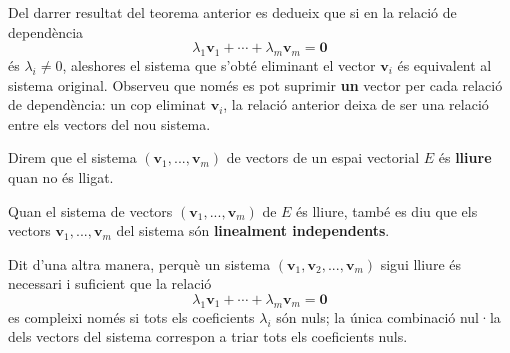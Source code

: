 \begin{observacio}
Del darrer resultat del teorema anterior es dedueix que si en la relació de
dependència%
\begin{equation*}
\lambda _{1}\mathbf{v}_{1}+\cdots +\lambda _{m}\mathbf{v}_{m}=\mathbf{0}
\end{equation*}%
és $\lambda _{i}\neq 0$, aleshores el sistema que s'obté eliminant el vector $%
\mathbf{v}_{i}$ és equivalent al sistema original. Observeu que només es pot
suprimir \textbf{un} vector per cada relació de dependència: un cop eliminat $%
\mathbf{v}_{i}$, la relació anterior deixa de ser una relació entre els
vectors del nou sistema.
\end{observacio}

\begin{definicio}
Direm que el sistema $(\mathbf{v}_{1},...,\mathbf{v}_{m})$ de vectors de
un espai vectorial $E$ és \textbf{lliure} quan no és lligat.

Quan el sistema de vectors $(\mathbf{v}_{1},...,\mathbf{v}_{m})$ de $%
E$ és lliure, també es diu que els vectors $\mathbf{v}%
_{1},...,\mathbf{v}_{m}$ del sistema són \textbf{linealment independents}.
\end{definicio}

\begin{observacio}
Dit d'una altra manera, perquè un sistema $(\mathbf{v}_{1},\mathbf{v}_{2},...,%
\mathbf{v}_{m})$ sigui lliure és necessari i suficient que la relació%
\begin{equation*}
\lambda _{1}\mathbf{v}_{1}+\cdots +\lambda _{m}\mathbf{v}_{m}=\mathbf{0}
\end{equation*}%
es compleixi només si tots els coeficients $\lambda _{i}$ són nuls; la 
única combinació nul·la dels vectors del sistema correspon a
triar tots els coeficients nuls.
\end{observacio}

